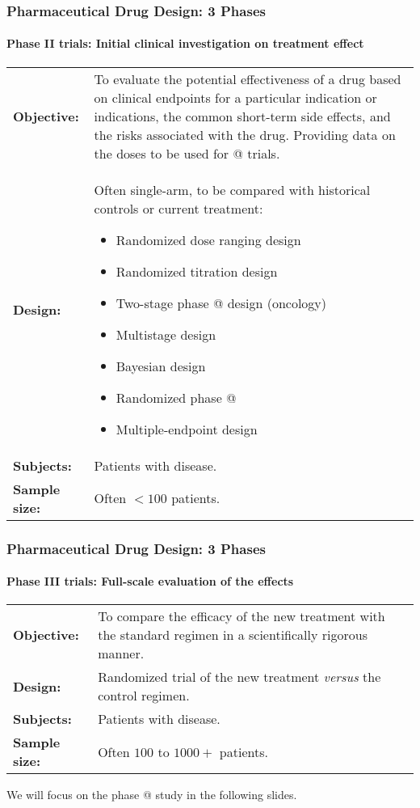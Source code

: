 \documentclass[table,10pt]{beamer}
\makeatletter
\newcommand{\Rmnum}[1]{\expandafter\@slowromancap\romannumeral #1@}
\makeatother
\begin{document}
\begin{CJK*}{UTF8}{gbsn}
\begin{frame}[t]
\frametitle{Pharmaceutical Drug Design: 3 Phases}
\framesubtitle{Phase II trials: Initial clinical investigation on treatment effect}
\begin{table}
\footnotesize
\begin{tabular}{p{}p{}}
\textbf{Objective:} & To evaluate the potential effectiveness of a drug based on clinical endpoints for a particular indication or indications, the common short-term side effects, and the risks associated with the drug. Providing data on the doses to be used for \Rmnum{3} trials.\\
\textbf{Design: } & Often single-arm, to be compared with historical controls or current treatment:
\begin{itemize}
	\item Randomized dose ranging design
	\item Randomized titration design
	\item Two-stage phase \Rmnum{2} design (oncology)
	\item Multistage design
	\item Bayesian design
	\item Randomized phase \Rmnum{2}
	\item Multiple-endpoint design
\end{itemize}\\
\textbf{Subjects:} & Patients with disease.\\
\textbf{Sample size: } & Often $<100$ patients.
\end{tabular}
\end{table}
\end{frame}

\begin{frame}[t]
\frametitle{Pharmaceutical Drug Design: 3 Phases}
\framesubtitle{Phase III trials: Full-scale evaluation of the effects}
\begin{table}
\begin{tabular}{p{}p{}}
\textbf{Objective:} & To compare the efficacy of the new treatment with the standard regimen in a scientifically rigorous manner.\\
\textbf{Design: } & Randomized trial of the new treatment \emph{versus} the control regimen.\\
\textbf{Subjects:} & Patients with disease.\\
\textbf{Sample size: } & Often $100$ to $1000+$ patients.
\end{tabular}
\end{table}
We will focus on the phase \Rmnum{3} study in the following slides.
\end{frame}



\end{CJK*}
\end{document}
